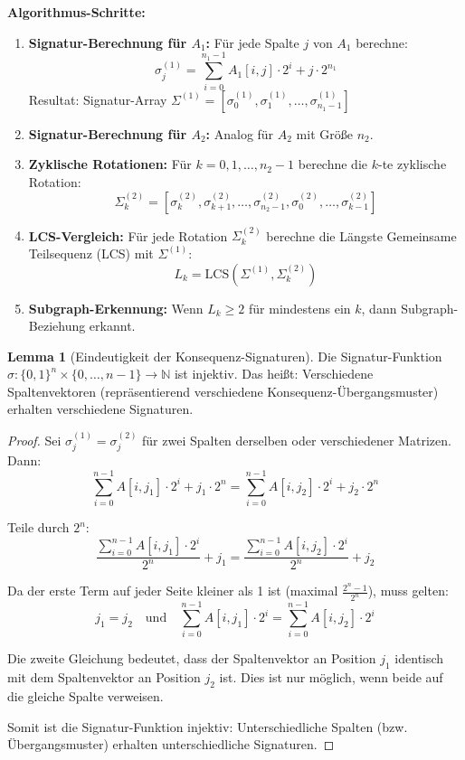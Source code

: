 \documentclass[a4paper,12pt]{article}
\theoremstyle{definition}
\newtheorem{lemma}{Lemma}
\begin{document}
\textbf{Algorithmus-Schritte:}

\begin{enumerate}
    \item \textbf{Signatur-Berechnung für $A_1$:}
    Für jede Spalte $j$ von $A_1$ berechne:
    \[
    \sigma_j^{(1)} = \sum_{i=0}^{n_1-1} A_1[i,j] \cdot 2^i + j \cdot 2^{n_1}
    \]
    Resultat: Signatur-Array $\Sigma^{(1)} = [\sigma_0^{(1)}, \sigma_1^{(1)}, \ldots, \sigma_{n_1-1}^{(1)}]$
    
    \item \textbf{Signatur-Berechnung für $A_2$:}
    Analog für $A_2$ mit Größe $n_2$.
    
    \item \textbf{Zyklische Rotationen:}
    Für $k = 0, 1, \ldots, n_2-1$ berechne die $k$-te zyklische Rotation:
    \[
    \Sigma^{(2)}_k = [\sigma_k^{(2)}, \sigma_{k+1}^{(2)}, \ldots, \sigma_{n_2-1}^{(2)}, \sigma_0^{(2)}, \ldots, \sigma_{k-1}^{(2)}]
    \]
    
    \item \textbf{LCS-Vergleich:}
    Für jede Rotation $\Sigma^{(2)}_k$ berechne die Längste Gemeinsame Teilsequenz (LCS) mit $\Sigma^{(1)}$:
    \[
    L_k = \text{LCS}(\Sigma^{(1)}, \Sigma^{(2)}_k)
    \]
    
    \item \textbf{Subgraph-Erkennung:}
    Wenn $L_k \geq 2$ für mindestens ein $k$, dann Subgraph-Beziehung erkannt.
\end{enumerate}

\begin{lemma}[Eindeutigkeit der Konsequenz-Signaturen]
\label{lem:eindeutigkeit_konsequenz}
Die Signatur-Funktion $\sigma: \{0,1\}^n \times \{0,\ldots,n-1\} \to \mathbb{N}$ ist injektiv. Das heißt: Verschiedene Spaltenvektoren (repräsentierend verschiedene Konsequenz-Übergangsmuster) erhalten verschiedene Signaturen.
\end{lemma}

\begin{proof}
Sei $\sigma_j^{(1)} = \sigma_j^{(2)}$ für zwei Spalten derselben oder verschiedener Matrizen. Dann:
\[
\sum_{i=0}^{n-1} A[i,j_1] \cdot 2^i + j_1 \cdot 2^n = \sum_{i=0}^{n-1} A[i,j_2] \cdot 2^i + j_2 \cdot 2^n
\]

Teile durch $2^n$:
\[
\frac{\sum_{i=0}^{n-1} A[i,j_1] \cdot 2^i}{2^n} + j_1 = \frac{\sum_{i=0}^{n-1} A[i,j_2] \cdot 2^i}{2^n} + j_2
\]

Da der erste Term auf jeder Seite kleiner als 1 ist (maximal $\frac{2^n - 1}{2^n}$), muss gelten:
\[
j_1 = j_2 \quad \text{und} \quad \sum_{i=0}^{n-1} A[i,j_1] \cdot 2^i = \sum_{i=0}^{n-1} A[i,j_2] \cdot 2^i
\]

Die zweite Gleichung bedeutet, dass der Spaltenvektor an Position $j_1$ identisch mit dem Spaltenvektor an Position $j_2$ ist. Dies ist nur möglich, wenn beide auf die gleiche Spalte verweisen.

Somit ist die Signatur-Funktion injektiv: Unterschiedliche Spalten (bzw. Übergangsmuster) erhalten unterschiedliche Signaturen.
\end{proof}
\end{document}
